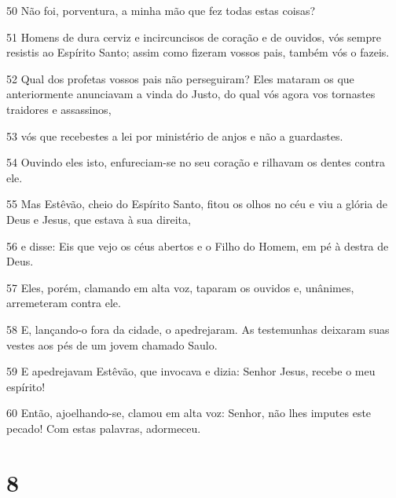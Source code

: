 \par 50 Não foi, porventura, a minha mão que fez todas estas coisas?
\par 51 Homens de dura cerviz e incircuncisos de coração e de ouvidos, vós sempre resistis ao Espírito Santo; assim como fizeram vossos pais, também vós o fazeis.
\par 52 Qual dos profetas vossos pais não perseguiram? Eles mataram os que anteriormente anunciavam a vinda do Justo, do qual vós agora vos tornastes traidores e assassinos,
\par 53 vós que recebestes a lei por ministério de anjos e não a guardastes.
\par 54 Ouvindo eles isto, enfureciam-se no seu coração e rilhavam os dentes contra ele.
\par 55 Mas Estêvão, cheio do Espírito Santo, fitou os olhos no céu e viu a glória de Deus e Jesus, que estava à sua direita,
\par 56 e disse: Eis que vejo os céus abertos e o Filho do Homem, em pé à destra de Deus.
\par 57 Eles, porém, clamando em alta voz, taparam os ouvidos e, unânimes, arremeteram contra ele.
\par 58 E, lançando-o fora da cidade, o apedrejaram. As testemunhas deixaram suas vestes aos pés de um jovem chamado Saulo.
\par 59 E apedrejavam Estêvão, que invocava e dizia: Senhor Jesus, recebe o meu espírito!
\par 60 Então, ajoelhando-se, clamou em alta voz: Senhor, não lhes imputes este pecado! Com estas palavras, adormeceu.

\chapter{8}

